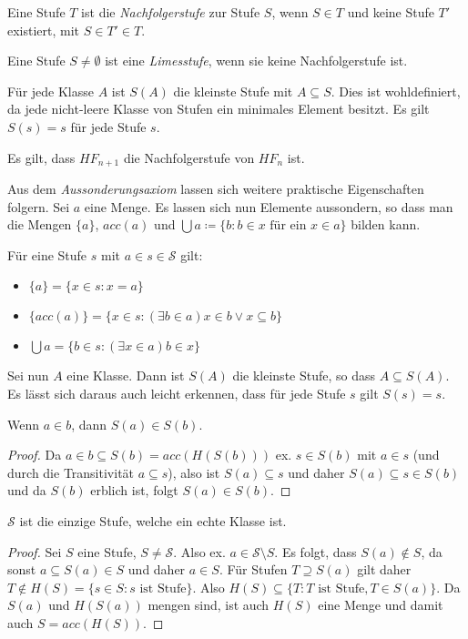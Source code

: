 \begin{definition}[Nachfolgerstufe]
	Eine Stufe $T$ ist die \textit{Nachfolgerstufe} zur Stufe $S$, wenn $S\in T$ und keine Stufe $T'$ existiert, mit $S\in T'\in T$.
\end{definition}

\begin{definition}[Limesstufe]
	Eine Stufe $S\neq \emptyset$ ist eine \textit{Limesstufe}, wenn sie keine Nachfolgerstufe ist.
\end{definition}

\begin{definition}
	Für jede Klasse $A$ ist $S(A)$ die kleinste Stufe mit $A\subseteq S$. Dies ist wohldefiniert, da jede nicht-leere Klasse von Stufen ein minimales Element besitzt. Es gilt $S(s)=s$ für jede Stufe $s$.
\end{definition}

Es gilt, dass $HF_{n+1}$ die Nachfolgerstufe von $HF_n$ ist.

Aus dem \textit{Aussonderungsaxiom} lassen sich weitere praktische Eigenschaften folgern. Sei $a$ eine Menge. Es lassen sich nun Elemente aussondern, so dass man die Mengen $\{a\}$, $acc(a)$ und $\bigcup a\coloneqq\{b : b\in x\text{ für ein } x \in a\}$ bilden kann.

Für eine Stufe $s$ mit $a\in s \in \mathcal{S}$ gilt:
\begin{itemize}
	\item $\{a\}=\{x\in s : x=a\}$
	\item $\{acc(a)\}=\{x\in s: (\exists b\in a)x\in b \lor x\subseteq b\}$
	\item $\bigcup a=\{b\in s : (\exists x\in a)b\in x\}$
\end{itemize}

Sei nun $A$ eine Klasse. Dann ist $S(A)$ die kleinste Stufe, so dass $A\subseteq S(A)$. Es lässt sich daraus auch leicht erkennen, dass für jede Stufe $s$ gilt $S(s)=s$.

\begin{lemma}
	Wenn $a\in b$, dann $S(a)\in S(b)$.
\end{lemma}
\begin{proof}
	Da $a\in b \subseteq S(b)=acc(H(S(b)))$ ex. $s\in S(b)$ mit $a\in s$ (und durch die Transitivität $a\subseteq s$), also ist $S(a)\subseteq s$ und daher $S(a)\subseteq s \in S(b)$ und da $S(b)$ erblich ist, folgt $S(a)\in S(b)$.
\end{proof}

\begin{lemma}
	$\mathcal{S}$ ist die einzige Stufe, welche ein echte Klasse ist.
	\label{EinzigeStufeDieKlasseIst}
\end{lemma}
\begin{proof}
	Sei $S$ eine Stufe, $S\neq \mathcal{S}$. Also ex. $a\in \mathcal{S}\setminus S$. Es folgt, dass $S(a)\notin S$, da sonst $a\subseteq S(a)\in S$ und daher $a\in S$. 
	Für Stufen $T \supseteq S(a)$ gilt daher $T \notin H(S)=\{s\in S : s \text{ ist Stufe}\}$. Also $H(S)\subseteq\{T : T \text{ ist Stufe}, T \in S(a)\}$. Da $S(a)$ und $H(S(a))$ mengen sind, ist auch $H(S)$ eine Menge und damit auch $S=acc(H(S))$.
\end{proof}


